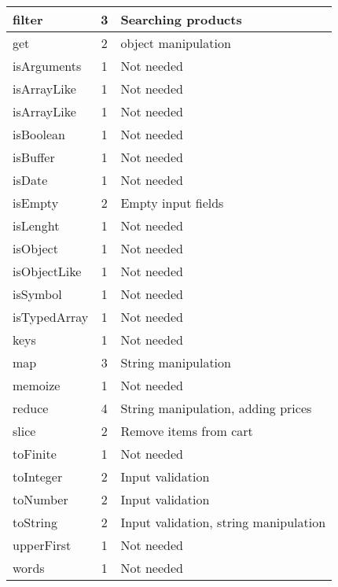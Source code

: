 \documentclass[a4paper, 12pt]{article}
\begin{document}
\begin{table}[h]
\begin{tabular}{l|c|l}
	    filter       & 3                 & Searching products                    \\ \hline
	    get          & 2                 & object manipulation                   \\ \hline
	    isArguments  & 1                 & Not needed                            \\ \hline
	    isArrayLike  & 1                 & Not needed                            \\ \hline
	    isArrayLike  & 1                 & Not needed                            \\ \hline
	    isBoolean    & 1                 & Not needed                            \\ \hline
	    isBuffer     & 1                 & Not needed                            \\ \hline
	    isDate       & 1                 & Not needed                            \\ \hline
	    isEmpty      & 2                 & Empty input fields                    \\ \hline
	    isLenght     & 1                 & Not needed                            \\ \hline
	    isObject     & 1                 & Not needed                            \\ \hline
	    isObjectLike & 1                 & Not needed                            \\ \hline
	    isSymbol     & 1                 & Not needed                            \\ \hline
	    isTypedArray & 1                 & Not needed                            \\ \hline
	    keys         & 1                 & Not needed                            \\ \hline
	    map          & 3                 & String manipulation                   \\ \hline
	    memoize      & 1                 & Not needed                            \\ \hline
	    reduce       & 4                 & String manipulation, adding prices    \\ \hline
	    slice        & 2                 & Remove items from cart                \\ \hline
	    toFinite     & 1                 & Not needed                            \\ \hline
	    toInteger    & 2                 & Input validation                      \\ \hline
	    toNumber     & 2                 & Input validation                      \\  \hline
	    toString     & 2                 & Input validation, string manipulation \\ \hline
	    upperFirst   & 1                 & Not needed                            \\ \hline
	    words        & 1                 & Not needed                           
	    \end{tabular}
    \end{table}
\end{document}
